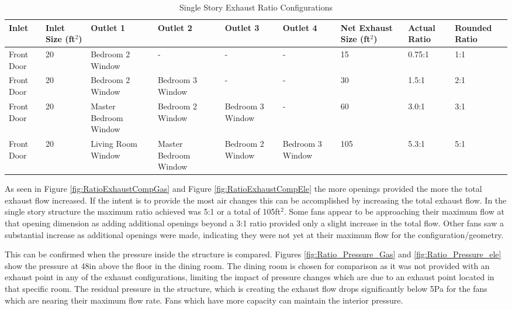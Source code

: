 \documentclass{article}
\begin{document}
\begin{table}[H]
	\centering
	\caption {Single Story Exhaust Ratio Configurations}
	\begin{tabular}{|C{.5in}|C{.6in}|C{.7in}|C{.7in}|C{.7in}|C{.7in}|C{.6in}|C{.5in}|C{.5in}|}
		\hline
		Inlet & Inlet Size (ft$^2$) & Outlet 1 & Outlet 2 & Outlet 3 & Outlet 4 & Net Exhaust Size (ft$^2$) & Actual Ratio & Rounded Ratio \\ \hline \hline
		Front Door & 20 & Bedroom 2 Window & - & - & - & 15 & 0.75:1 & 1:1 \\ \hline
		Front Door & 20 & Bedroom 2 Window & Bedroom 3 Window & - & - & 30 & 1.5:1 & 2:1 \\ \hline
		Front Door & 20 & Master Bedroom Window & Bedroom 2 Window & Bedroom 3 Window & - & 60 & 3.0:1 & 3:1 \\ \hline
		Front Door & 20 & Living Room Window & Master Bedroom Window & Bedroom 2 Window & Bedroom 3 Window & 105 & 5.3:1 & 5:1 \\ \hline
	\end{tabular}
	\label{table:RatioExhaustComp}
\end{table}

As seen in Figure \ref{fig:RatioExhaustCompGas} and Figure \ref{fig:RatioExhaustCompEle} the more openings provided the more the total exhaust flow increased. If the intent is to provide the most air changes this can be accomplished by increasing the total exhaust flow. In the single story structure the maximum ratio achieved was 5:1 or a total of 105ft$^2$. Some fans appear to be approaching their maximum flow at that opening dimension as adding additional openings beyond a 3:1 ratio provided only a slight increase in the total flow. Other fans saw a substantial increase as additional openings were made, indicating they were not yet at their maximum flow for the configuration/geometry. 

This can be confirmed when the pressure inside the structure is compared. Figures \ref{fig:Ratio_Pressure_Gas} and \ref{fig:Ratio_Pressure_ele} show the pressure at 48in above the floor in the dining room. The dining room is chosen for comparison as it was not provided with an exhaust point in any of the exhaust configurations, limiting the impact of pressure changes which are due to an exhaust point located in that specific room. The residual pressure in the structure, which is creating the exhaust flow drops significantly below 5Pa for the fans which are nearing their maximum flow rate. Fans which have more capacity can maintain the interior pressure. 
\end{document}
